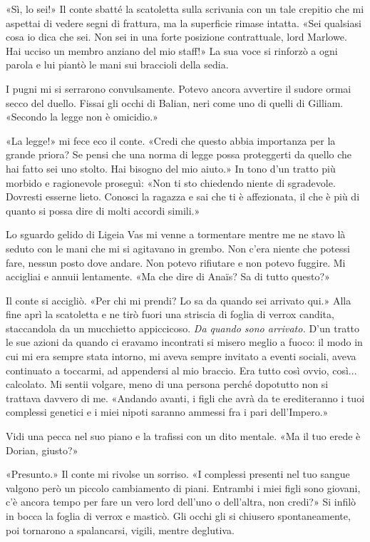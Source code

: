 «Sì, lo sei!» Il conte sbatté la scatoletta sulla scrivania con un tale
crepitio che mi aspettai di vedere segni di frattura, ma la superficie
rimase intatta. «Sei qualsiasi cosa io dica che sei. Non sei in una
forte posizione contrattuale, lord Marlowe. Hai ucciso un membro anziano
del mio staff!» La sua voce si rinforzò a ogni parola e lui piantò le
mani sui braccioli della sedia.

I pugni mi si serrarono convulsamente. Potevo ancora avvertire il sudore
ormai secco del duello. Fissai gli occhi di Balian, neri come uno di
quelli di Gilliam. «Secondo la legge non è omicidio.»

«La legge!» mi fece eco il conte. «Credi che questo abbia importanza per
la grande priora? Se pensi che una norma di legge possa proteggerti da
quello che hai fatto sei uno stolto. Hai bisogno del mio aiuto.» In tono
d'un tratto più morbido e ragionevole proseguì: «Non ti sto chiedendo
niente di sgradevole. Dovresti esserne lieto. Conosci la ragazza e sai
che ti è affezionata, il che è più di quanto si possa dire di molti
accordi simili.»

Lo sguardo gelido di Ligeia Vas mi venne a tormentare mentre me ne stavo
là seduto con le mani che mi si agitavano in grembo. Non c'era niente
che potessi fare, nessun posto dove andare. Non potevo rifiutare e non
potevo fuggire. Mi accigliai e annuii lentamente. «Ma che dire di Anaïs?
Sa di tutto questo?»

Il conte si accigliò. «Per chi mi prendi? Lo sa da quando sei arrivato
qui.» Alla fine aprì la scatoletta e ne tirò fuori una striscia di
foglia di verrox candita, staccandola da un mucchietto appiccicoso.
\emph{Da quando sono arrivato.} D'un tratto le sue azioni da quando ci
eravamo incontrati si misero meglio a fuoco: il modo in cui mi era
sempre stata intorno, mi aveva sempre invitato a eventi sociali, aveva
continuato a toccarmi, ad appendersi al mio braccio. Era tutto così
ovvio, così... calcolato. Mi sentii volgare, meno di una persona perché
dopotutto non si trattava davvero di me. «Andando avanti, i figli che
avrà da te erediteranno i tuoi complessi genetici e i miei nipoti
saranno ammessi fra i pari dell'Impero.»

Vidi una pecca nel suo piano e la trafissi con un dito mentale. «Ma il
tuo erede è Dorian, giusto?»

«Presunto.» Il conte mi rivolse un sorriso. «I complessi presenti nel
tuo sangue valgono però un piccolo cambiamento di piani. Entrambi i miei
figli sono giovani, c'è ancora tempo per fare un vero lord dell'uno o
dell'altra, non credi?» Si infilò in bocca la foglia di verrox e
masticò. Gli occhi gli si chiusero spontaneamente, poi tornarono a
spalancarsi, vigili, mentre deglutiva.

